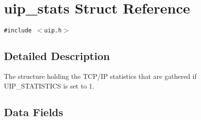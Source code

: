 \hypertarget{a00031}{
\section{uip\_\-stats Struct Reference}
\label{a00031}
}
{\tt \#include $<$uip.h$>$}



\subsection{Detailed Description}
The structure holding the TCP/IP statistics that are gathered if UIP\_\-STATISTICS is set to 1. 

\subsection*{Data Fields}
